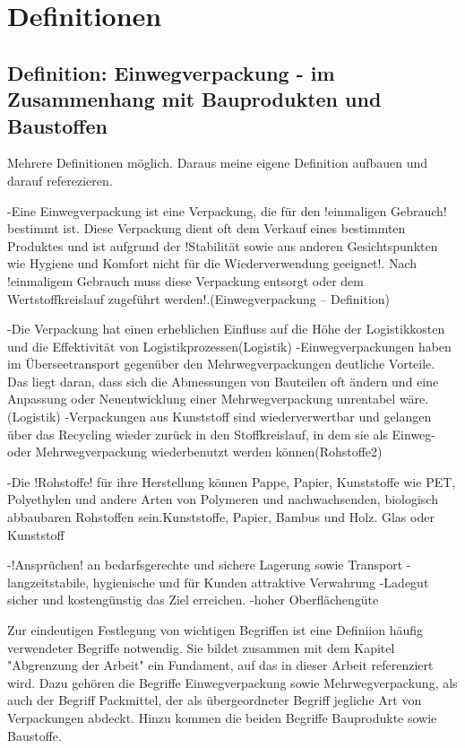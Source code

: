 

\chapter{Definitionen}
\label{ch:Definitionen}



\section{Definition: Einwegverpackung - im Zusammenhang mit
Bauprodukten und Baustoffen}
\label{sec:Definitionen:Einwegverpackung im Zusammenhang mit Bauprodukten und Baustoffen}

Mehrere Definitionen möglich. Daraus meine eigene Definition aufbauen und darauf referezieren.

-Eine Einwegverpackung ist eine Verpackung, die für den !einmaligen Gebrauch! bestimmt ist. Diese Verpackung dient oft dem Verkauf eines bestimmten Produktes und ist aufgrund der !Stabilität sowie aus anderen Gesichtspunkten wie Hygiene und Komfort nicht für die Wiederverwendung geeignet!. Nach !einmaligem Gebrauch muss diese Verpackung entsorgt oder dem Wertstoffkreislauf zugeführt werden!.(Einwegverpackung – Definition)

-Die Verpackung hat einen erheblichen Einfluss auf die Höhe der Logistikkosten und die Effektivität von Logistikprozessen(Logistik)
-Einwegverpackungen haben im Überseetransport gegenüber den Mehrwegverpackungen deutliche Vorteile. Das liegt daran, dass sich die Abmessungen von Bauteilen oft ändern und eine Anpassung oder Neuentwicklung einer Mehrwegverpackung unrentabel wäre.(Logistik)
-Verpackungen aus Kunststoff sind wiederverwertbar und gelangen über das Recycling wieder zurück in den Stoffkreislauf, in dem sie als Einweg- oder Mehrwegverpackung wiederbenutzt werden können(Rohstoffe2)

-Die !Rohstoffe! für ihre Herstellung können Pappe, Papier, Kunststoffe wie PET, Polyethylen und andere Arten von Polymeren und nachwachsenden, biologisch abbaubaren Rohstoffen sein.Kunststoffe, Papier, Bambus und Holz. Glas oder Kunststoff

    -!Ansprüchen! an bedarfsgerechte und sichere Lagerung sowie Transport
    -langzeitstabile, hygienische und für Kunden attraktive Verwahrung
    -Ladegut sicher und kostengünstig das Ziel erreichen.
    -hoher Oberflächengüte



Zur eindeutigen Festlegung von wichtigen Begriffen ist eine Definiion häufig verwendeter Begriffe notwendig. Sie bildet zusammen mit dem Kapitel "Abgrenzung der Arbeit" ein Fundament, auf das in dieser Arbeit referenziert wird.
Dazu gehören die Begriffe Einwegverpackung sowie Mehrwegverpackung, als auch der Begriff Packmittel, der als übergeordneter Begriff jegliche Art von Verpackungen abdeckt. Hinzu kommen die beiden Begriffe Bauprodukte sowie Baustoffe.   




